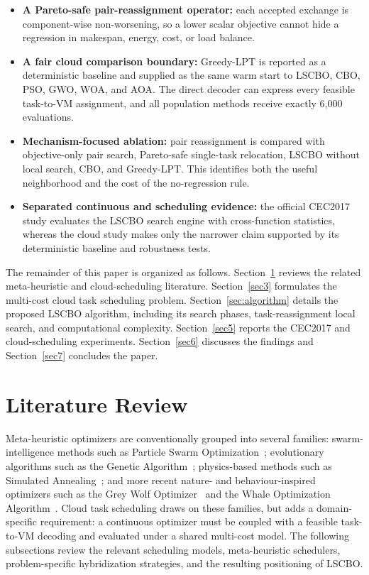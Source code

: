 \documentclass[pdflatex,onecolumn,sn-mathphys-num]{sn-jnl}
\begin{document}
\begin{itemize}
    \item \textbf{A Pareto-safe pair-reassignment operator:} each accepted exchange is component-wise non-worsening, so a lower scalar objective cannot hide a regression in makespan, energy, cost, or load balance.
    \item \textbf{A fair cloud comparison boundary:} Greedy-LPT is reported as a deterministic baseline and supplied as the same warm start to LSCBO, CBO, PSO, GWO, WOA, and AOA. The direct decoder can express every feasible task-to-VM assignment, and all population methods receive exactly 6,000 evaluations.
    \item \textbf{Mechanism-focused ablation:} pair reassignment is compared with objective-only pair search, Pareto-safe single-task relocation, LSCBO without local search, CBO, and Greedy-LPT. This identifies both the useful neighborhood and the cost of the no-regression rule.
    \item \textbf{Separated continuous and scheduling evidence:} the official CEC2017 study evaluates the LSCBO search engine with cross-function statistics, whereas the cloud study makes only the narrower claim supported by its deterministic baseline and robustness tests.
\end{itemize}

The remainder of this paper is organized as follows. Section~\ref{sec2} reviews the related meta-heuristic and cloud-scheduling literature. Section~\ref{sec3} formulates the multi-cost cloud task scheduling problem. Section~\ref{sec:algorithm} details the proposed LSCBO algorithm, including its search phases, task-reassignment local search, and computational complexity. Section~\ref{sec5} reports the CEC2017 and cloud-scheduling experiments. Section~\ref{sec6} discusses the findings and Section~\ref{sec7} concludes the paper.

\section{Literature Review}\label{sec2}

Meta-heuristic optimizers are conventionally grouped into several families: swarm-intelligence methods such as Particle Swarm Optimization~\cite{Kennedy1995}; evolutionary algorithms such as the Genetic Algorithm~\cite{Goldberg1989}; physics-based methods such as Simulated Annealing~\cite{Kirkpatrick1983}; and more recent nature- and behaviour-inspired optimizers such as the Grey Wolf Optimizer~\cite{Mirjalili2014} and the Whale Optimization Algorithm~\cite{Mirjalili2016}. Cloud task scheduling draws on these families, but adds a domain-specific requirement: a continuous optimizer must be coupled with a feasible task-to-VM decoding and evaluated under a shared multi-cost model. The following subsections review the relevant scheduling models, meta-heuristic schedulers, problem-specific hybridization strategies, and the resulting positioning of LSCBO.
\end{document}
